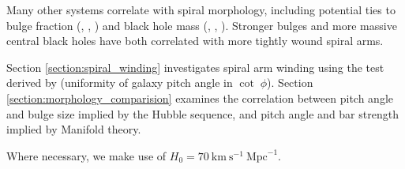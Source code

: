 Many other systems correlate with spiral morphology, including potential ties to bulge fraction (\citealt{1975A&A....44..363Y}, \citealt{2013MNRAS.436.1074S}, \citealt{2019MNRAS.487.1808M}) and black hole mass (\citealt{2008ApJ...678L..93S}, \citealt{2017MNRAS.471.2187D}, \citealt{2019MS&E..571a2118A}). Stronger bulges and more massive central black holes have both correlated with more tightly wound spiral arms.

Section \ref{section:spiral_winding} investigates spiral arm winding using the test derived by \cite{2019arXiv190910291P} (uniformity of galaxy pitch angle in $\cot\;\phi$). Section \ref{section:morphology_comparision} examines the correlation between pitch angle and bulge size implied by the Hubble sequence, and pitch angle and bar strength implied by Manifold theory.

Where necessary, we make use of $H_0 = 70\ \text{km}\ \text{s}^{-1}\ \text{Mpc}^{-1}$.
